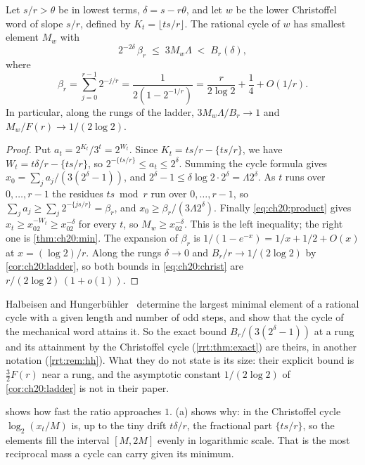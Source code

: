 \begin{theorem}\label{thm:ch20:christoffel}
Let $s/r>\theta$ be in lowest terms, $\delta=s-r\theta$, and let $w$ be the lower Christoffel word of slope $s/r$, defined by $K_t=\lfloor ts/r\rfloor$. The rational cycle of $w$ has smallest element $M_w$ with
\begin{equation}\label{eq:ch20:christ}
2^{-2\delta}\,\beta_r\;\le\;3M_w\Lambda\;<\;B_r(\delta),
\end{equation}
where
\[
\beta_r=\sum_{j=0}^{r-1}2^{-j/r}=\frac{1}{2(1-2^{-1/r})}=\frac{r}{2\log2}+\frac14+O(1/r).
\]
In particular, along the rungs of the ladder, $3M_w\Lambda/B_r\to1$ and $M_w/F(r)\to1/(2\log2)$.
\end{theorem}

\begin{proof}
Put $a_t=2^{K_t}/3^t=2^{W_t}$. Since $K_t=ts/r-\{ts/r\}$, we have $W_t=t\delta/r-\{ts/r\}$, so $2^{-\{ts/r\}}\le a_t\le2^{\delta}$. Summing the cycle formula gives $x_0=\sum_ja_j/(3(2^\delta-1))$, and $2^\delta-1\le\delta\log2\cdot2^\delta=\Lambda2^\delta$. As $t$ runs over $0,\dots,r-1$ the residues $ts\bmod r$ run over $0,\dots,r-1$, so $\sum_ja_j\ge\sum_j2^{-\{js/r\}}=\beta_r$, and $x_0\ge\beta_r/(3\Lambda2^\delta)$. Finally \eqref{eq:ch20:product} gives $x_t\ge x_02^{-W_t}\ge x_02^{-\delta}$ for every $t$, so $M_w\ge x_02^{-\delta}$. This is the left inequality; the right one is \cref{thm:ch20:min}. The expansion of $\beta_r$ is $1/(1-e^{-x})=1/x+1/2+O(x)$ at $x=(\log2)/r$. Along the rungs $\delta\to0$ and $B_r/r\to1/(2\log2)$ by \cref{cor:ch20:ladder}, so both bounds in \eqref{eq:ch20:christ} are $r/(2\log2)\,(1+o(1))$.
\end{proof}

Halbeisen and Hungerb\"uhler~\cite{halbeisen1997} determine the largest minimal element of a rational cycle with a given length and number of odd steps, and show that the cycle of the mechanical word attains it. So the exact bound $B_r/(3(2^{\delta}-1))$ at a rung and its attainment by the Christoffel cycle (\cref{rrt:thm:exact}) are theirs, in another notation (\cref{rrt:rem:hh}). What they do not state is its size: their explicit bound is $\tfrac32F(r)$ near a rung, and the asymptotic constant $1/(2\log2)$ of \cref{cor:ch20:ladder} is not in their paper.

 shows how fast the ratio approaches $1$. (a) shows why: in the Christoffel cycle $\log_2(x_t/M)$ is, up to the tiny drift $t\delta/r$, the fractional part $\{ts/r\}$, so the elements fill the interval $[M,2M]$ evenly in logarithmic scale. That is the most reciprocal mass a cycle can carry given its minimum.

